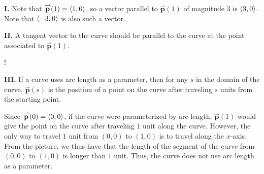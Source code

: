 \documentclass[noauthor,handout]{ximera}
\renewcommand{\vec}[1]{{\overset{\boldsymbol{\rightharpoonup}}{\mathbf{#1}}}}
\begin{document}
\begin{problem}
\begin{freeResponse}
\textbf{I.} Note that $\vec{p}(1) = \vector{1,0}$, so a vector parallel to $\vec{p}(1)$ of magnitude $3$ is $\left\langle 3,0\right\rangle$.  Note that $\left\langle -3,0\right\rangle$ is also such a vector.

\textbf{II.} A tangent vector to the curve should be parallel to the curve at the point associated to $\vec{p}(1)$.  

\begin{center}
\resizebox {4cm} {!} { 
    }
\end{center}

\textbf{III.} If a curve uses arc length as a parameter, then for any $s$ in the domain of the curve, $\vec{p}(s)$ is the position of a point on the curve after traveling $s$ units from the starting point.  

Since $\vec{p}(0)=\vector{0,0}$, if the curve were parameterized by arc length, $\vec{p}(1)$ would give the point on the curve after traveling $1$ unit along the curve.  However, the only way to travel $1$ unit from $(0,0)$ to $(1,0)$ is to travel along the $x$-axis.  From the picture, we thus have that the length of the segment of the curve from $(0,0)$ to $(1,0)$ is longer than $1$ unit.  Thus, the curve does not use arc length as a parameter.  

\end{freeResponse}


\end{problem}
\end{document}
